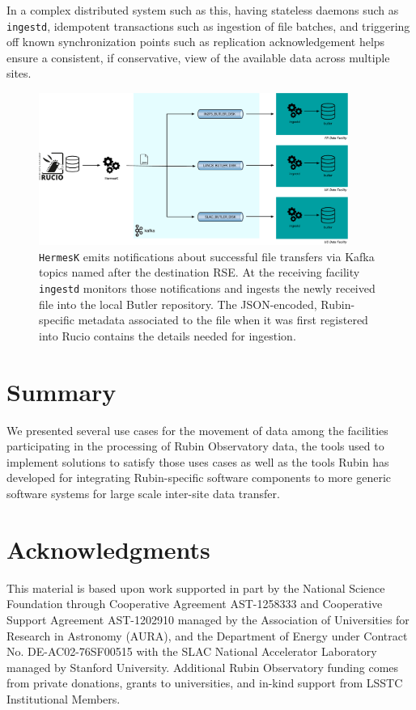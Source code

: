 \documentclass{webofc}
\begin{document}
In a complex distributed system such as this, having stateless daemons such as \texttt{ingestd}, idempotent transactions such as ingestion of file batches, and triggering off known synchronization points such as replication acknowledgement helps ensure a consistent, if conservative, view of the available data across multiple sites.

\begin{figure}[h]
\includegraphics[width=0.9\textwidth, center]{images/hermes_and_ingestd.pdf}
\caption{\texttt{HermesK} emits notifications about successful file transfers via Kafka topics named after the destination RSE. At the receiving facility \texttt{ingestd} monitors those notifications and ingests the newly received file into the local Butler repository. The JSON-encoded, Rubin-specific metadata associated to the file when it was first registered into Rucio contains the details needed for ingestion.}
\label{fig:kafka-control-plane}
\end{figure}


\section{Summary}
\label{summary}
We presented several use cases for the movement of data among the facilities participating in the processing of Rubin Observatory data, the tools used to implement solutions to satisfy those uses cases as well as the tools Rubin has developed for integrating Rubin-specific software components to more generic software systems for large scale inter-site data transfer.

\section{Acknowledgments}

This material is based upon work supported in part by the National Science Foundation through Cooperative Agreement AST-1258333 and Cooperative Support Agreement AST-1202910 managed by the Association of Universities for Research in Astronomy (AURA), and the Department of Energy under Contract No. DE-AC02-76SF00515 with the SLAC National Accelerator Laboratory managed by Stanford University. Additional Rubin Observatory funding comes from private donations, grants to universities, and in-kind support from LSSTC Institutional Members.
\end{document}
